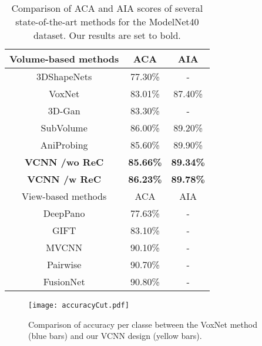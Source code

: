 \documentclass[preprint,12pt]{elsarticle}
\begin{document}
\begin{table}[t!]
\normalsize
\centering
\caption{Comparison of ACA and AIA scores of several state-of-the-art
methods for the ModelNet40 dataset. Our results are set to bold. }\label{table.ACAAIA}
\begin{tabular}{|c|c|c|}
\hline
Volume-based methods                 & ACA              & AIA              \\ \hline
3DShapeNets\cite{wu20153d}            & 77.30\%          & -                \\ \hline
VoxNet\cite{maturana2015voxnet}               & 83.01\%          & 87.40\%          \\ \hline
3D-Gan \cite{wu2016learning}                & 83.30\%          & -                \\ \hline
SubVolume\cite{qi2016volumetric}              & 86.00\%          & 89.20\%          \\ \hline
AniProbing \cite{qi2016volumetric}            & 85.60\%          & 89.90\%          \\ \hline
\textbf{VCNN /wo ReC}       & \textbf{85.66\%} & \textbf{89.34\%} \\ \hline
\textbf{VCNN /w ReC} & \textbf{86.23\%} & \textbf{89.78\%} \\ \hline \hline
View-based methods                 & ACA              & AIA              \\ \hline 
DeepPano \cite{shi2015deeppano}              & 77.63\%          & -                \\ \hline
GIFT \cite{bai2016gift}                  & 83.10\%          & -                \\ \hline
MVCNN \cite{su2015multi}                 & 90.10\%          & -                \\ \hline
Pairwise \cite{johns2016pairwise}              & 90.70\%           & -                \\ \hline
FusionNet \cite{hegde2016fusionnet}             & 90.80\%           & -                \\ \hline
\end{tabular}%
\end{table}

\begin{figure}[t!]
\centering
\texttt{[image: accuracyCut.pdf]}
\caption{Comparison of accuracy per classe between the VoxNet method
(blue bars) and our VCNN design (yellow bars).}\label{fig.AccPerClass}
\vspace{-1.5em}
\end{figure}
\end{document}
